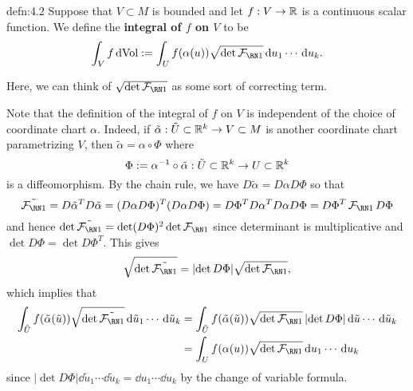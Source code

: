 \begin{defn}{defn:4.2}
    Suppose that $V \subset M$ is bounded and let $f : V \to \mathbb{R}$ is a continuous 
    scalar function. We define the {\bf integral of $f$ on $V$} to be 
    \[ \int_V f\dVol := \int_U f(\alpha(u))\sqrt{\det\FFF}\dd u_1 \cdots \dd u_k. \] 
\end{defn}\vspace{-0.25cm}

Here, we can think of $\sqrt{\det\FFF}$ as some sort of correcting term. 

Note that the definition of the integral of $f$ on $V$ is independent of the 
choice of coordinate chart $\alpha$. Indeed, if $\tilde\alpha : 
\tilde U \subset \mathbb{R}^k \to V \subset M$ is another coordinate chart 
parametrizing $V$, then $\tilde\alpha = \alpha \circ \Phi$ where 
\[ \Phi := \alpha^{-1} \circ \tilde\alpha : \tilde U \subset \mathbb{R}^k 
\to U \subset \mathbb{R}^k \] 
is a diffeomorphism. By the chain rule, we have $D\tilde\alpha 
= D\alpha D\Phi$ so that 
\[ \tilde\FFF = D\tilde\alpha^T D\tilde\alpha = (D\alpha D\Phi)^T 
(D\alpha D\Phi) = D\Phi^T D\alpha^T D\alpha D\Phi = D\Phi^T \FFF D\Phi \] 
and hence $\det\tilde\FFF = \det(D\Phi)^2 \det\FFF$ since determinant is 
multiplicative and $\det D\Phi = \det D\Phi^T$.
This gives
\[ \sqrt{\det\tilde\FFF} = \lvert\det D\Phi\rvert \sqrt{\det \FFF}, \] 
which implies that 
\begin{align*}
    \int_{\tilde U} f(\tilde\alpha(\tilde u)) \sqrt{\det\tilde\FFF} \dd\tilde u_1 \cdots \dd\tilde u_k  
    &= \int_{\tilde U} f(\tilde\alpha(\tilde u)) \sqrt{\det\FFF} \,\lvert\det D\Phi\rvert \dd\tilde u \cdots \dd\tilde u_k \\ 
    &= \int_U f(\alpha(u)) \sqrt{\det\FFF} \dd u_1 \cdots \dd u_k 
\end{align*} 
since $\lvert\det D\Phi\rvert \dd\tilde u_1 \cdots \dd\tilde u_k 
= \dd u_1 \cdots \dd u_k$ by the change of variable formula. 

